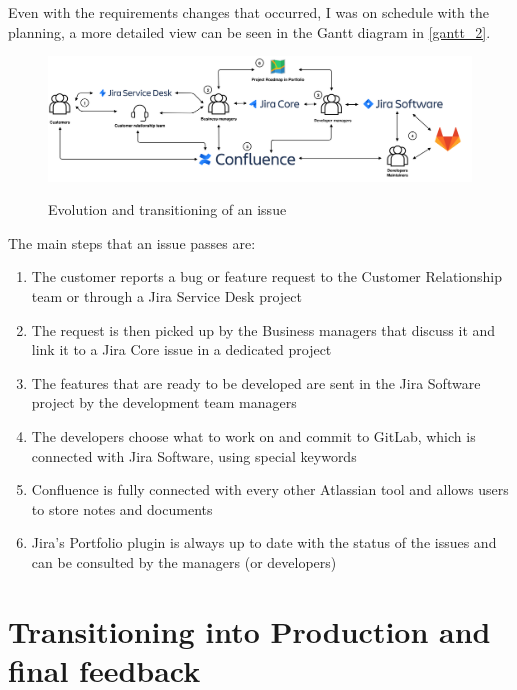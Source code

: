 	Even with the requirements changes that occurred, I was on schedule with the planning, a more detailed view can be seen in the Gantt diagram in \ref{gantt_2}.
	\newpage
	\begin{landscape}
		\vspace*{\fill}
		\begin{figure}[H]
			\centering
			\includegraphics[width=22cm]{resources/UntitledDiagrammmmm}\\
			\caption{Evolution and transitioning of an issue}
		\end{figure}
		The main steps that an issue passes are:
		\begin{enumerate}
			\item The customer reports a bug or feature request to the Customer Relationship team or through a Jira Service Desk project
			\item The request is then picked up by the Business managers that discuss it and link it to a Jira Core issue in a dedicated project
			\item The features that are ready to be developed are sent in the Jira Software project by the development team managers
			\item The developers choose what to work on and commit to GitLab, which is connected with Jira Software, using special keywords
			\item Confluence is fully connected with every other Atlassian tool and allows users to store notes and documents
			\item Jira's Portfolio plugin is always up to date with the status of the issues and can be consulted by the managers (or developers)
		\end{enumerate}
		\hfill
		\vspace*{\fill}
	\end{landscape}
	\newpage

\section{Transitioning into Production and final feedback}


